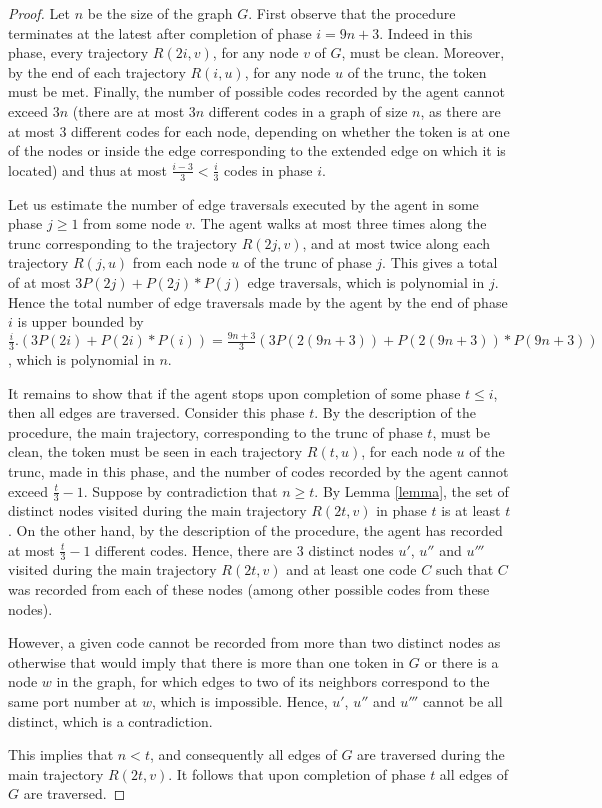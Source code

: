 \documentclass [11pt] {article}
\begin{document}
\begin{proof}
{Let $n$ be the size of the graph $G$.
First observe that the procedure terminates at the latest after completion of phase {$i=9n+3$}. Indeed in this phase, every trajectory $R(2i,v)$, for any node $v$ of $G$, must be clean.
{Moreover, by the end of each trajectory $R(i,u)$, for any node $u$ of the trunc, the token must be met. Finally,} the number of possible codes recorded by the agent cannot exceed {$3n$ (there are at most $3n$ different codes in a graph of size $n$, as there are at most $3$ different codes for each node, {depending on whether the token is at one of the nodes or inside the edge corresponding to the extended edge on which it is located)} and thus at most $\frac{i-3}{3}<\frac{i}{3}$ codes in phase $i$.}}

{Let us estimate the number of edge traversals executed by the agent in some phase $j\geq1$ from some node $v$. The agent walks at most three times along the trunc corresponding to the trajectory $R(2j,v)$, and at most twice along each trajectory $R(j,u)$ from each node $u$ of the trunc of phase $j$. This gives a total of at most $3P(2j)+P(2j)*P(j)$ edge traversals, which is polynomial in $j$.}
{Hence the total number of edge traversals made by the agent by the end of phase $i$ is upper bounded by {$\frac{i}{3}.(3P(2i)+P(2i)*P(i))=\frac{9n+3}{3}(3P(2(9n+3))+P(2(9n+3))*P(9n+3))$, which is polynomial in $n$.}}

{It remains to show that if the agent stops upon completion of some phase $t \leq i$, then all {edges are traversed}. Consider this phase $t$.  By the description of the procedure, the main trajectory, corresponding to the trunc of phase $t$, must be clean, the token must be seen
in each trajectory $R(t,u)$, for each node $u$ of the trunc, made in this phase, and the number of codes recorded by the agent cannot exceed {$\frac{t}{3}-1$}.
Suppose by contradiction that $n\geq t$.
By Lemma \ref{lemma}, the set of distinct nodes visited during the main trajectory $R(2t,v)$ in phase $t$ is at least $t$.
On the other hand, by the description of the procedure, the agent has recorded at most {$\frac{t}{3}-1$} different codes.}
{Hence, there are $3$ distinct nodes $u'$, $u''$ and $u'''$ visited during the main trajectory $R(2t,v)$ and at least one code $C$ such that $C$ was recorded from each of these nodes (among  other possible codes from these nodes).}

{However, a given code cannot be recorded from more than two distinct nodes as otherwise that would imply that there is more than one token in $G$ or there is a node $w$ in the graph, for which edges to two of its neighbors correspond to the same port number at $w$, which is impossible. Hence, $u'$, $u''$ and $u'''$ cannot be all distinct, which is a contradiction.}

{This implies that $n<t$, and consequently all {edges of $G$ are traversed} during the main trajectory $R(2t,v)$. It follows that upon completion of phase $t$ all {edges of $G$ are traversed}.}
\end{proof}
\end{document}
